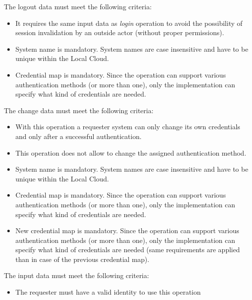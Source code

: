 \documentclass[a4paper]{arrowhead}
\begin{document}
The logout data must meet the following criteria:

\begin{itemize}
    \item It requires the same input data as \textit{login} operation to avoid the possibility of session invalidation by an outside actor (without proper permissions). 
    \item System name is mandatory. System names are case insensitive and have to be unique within the Local Cloud.
    \item Credential map is mandatory. Since the operation can support various authentication methods (or more than one), only the implementation can specify what kind of credentials are needed.
\end{itemize}


The change data must meet the following criteria:

\begin{itemize}
    \item With this operation a requester system can only change its own credentials and only after a successful authentication.
    \item This operation does not allow to change the assigned authentication method.
    \item System name is mandatory. System names are case insensitive and have to be unique within the Local Cloud.
    \item Credential map is mandatory. Since the operation can support various authentication methods (or more than one), only the implementation can specify what kind of credentials are needed.
    \item New credential map is mandatory. Since the operation can support various authentication methods (or more than one), only the implementation can specify what kind of credentials are needed (same requirements are applied than in case of the previous credential map). 
\end{itemize}


The input data must meet the following criteria:

\begin{itemize}
    \item The requester must have a valid identity to use this operation
\end{itemize}
\end{document}
